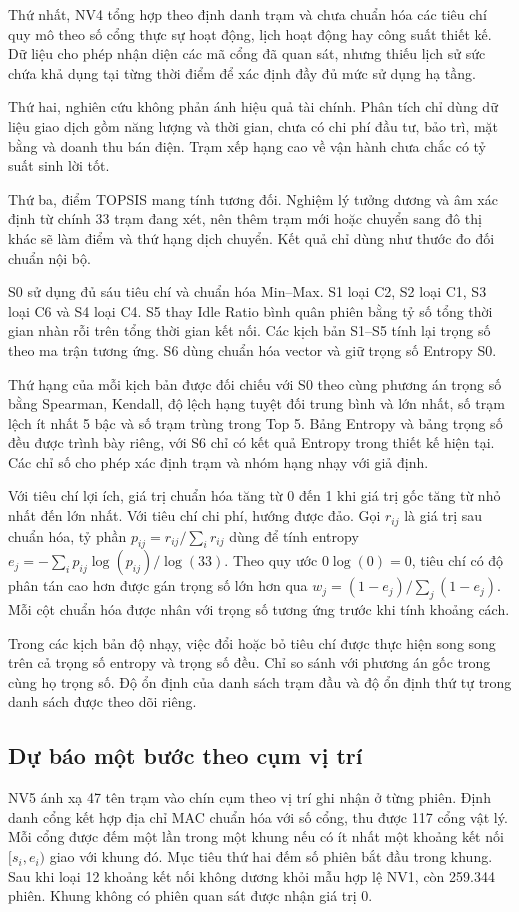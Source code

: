 \documentclass[conference,a4paper]{IEEEtran}
\begin{document}
Thứ nhất, NV4 tổng hợp theo định danh trạm và chưa chuẩn hóa các tiêu chí quy mô theo số cổng thực sự hoạt động, lịch hoạt động hay công suất thiết kế. Dữ liệu cho phép nhận diện các mã cổng đã quan sát, nhưng thiếu lịch sử sức chứa khả dụng tại từng thời điểm để xác định đầy đủ mức sử dụng hạ tầng.

Thứ hai, nghiên cứu không phản ánh hiệu quả tài chính. Phân tích chỉ dùng dữ liệu giao dịch gồm năng lượng và thời gian, chưa có chi phí đầu tư, bảo trì, mặt bằng và doanh thu bán điện. Trạm xếp hạng cao về vận hành chưa chắc có tỷ suất sinh lời tốt.

Thứ ba, điểm TOPSIS mang tính tương đối. Nghiệm lý tưởng dương và âm xác định từ chính 33 trạm đang xét, nên thêm trạm mới hoặc chuyển sang đô thị khác sẽ làm điểm và thứ hạng dịch chuyển. Kết quả chỉ dùng như thước đo đối chuẩn nội bộ.

S0 sử dụng đủ sáu tiêu chí và chuẩn hóa Min–Max. S1 loại C2, S2 loại C1, S3 loại C6 và S4 loại C4. S5 thay Idle Ratio bình quân phiên bằng tỷ số tổng thời gian nhàn rỗi trên tổng thời gian kết nối. Các kịch bản S1–S5 tính lại trọng số theo ma trận tương ứng. S6 dùng chuẩn hóa vector và giữ trọng số Entropy S0.

Thứ hạng của mỗi kịch bản được đối chiếu với S0 theo cùng phương án trọng số bằng Spearman, Kendall, độ lệch hạng tuyệt đối trung bình và lớn nhất, số trạm lệch ít nhất 5 bậc và số trạm trùng trong Top 5. Bảng Entropy và bảng trọng số đều được trình bày riêng, với S6 chỉ có kết quả Entropy trong thiết kế hiện tại. Các chỉ số cho phép xác định trạm và nhóm hạng nhạy với giả định.

Với tiêu chí lợi ích, giá trị chuẩn hóa tăng từ 0 đến 1 khi giá trị gốc tăng từ nhỏ nhất đến lớn nhất. Với tiêu chí chi phí, hướng được đảo. Gọi $r_{ij}$ là giá trị sau chuẩn hóa, tỷ phần $p_{ij}=r_{ij}/\sum_i r_{ij}$ dùng để tính entropy $e_j=-\sum_i p_{ij}\log(p_{ij})/\log(33)$. Theo quy ước $0\log(0)=0$, tiêu chí có độ phân tán cao hơn được gán trọng số lớn hơn qua $w_j=(1-e_j)/\sum_j(1-e_j)$. Mỗi cột chuẩn hóa được nhân với trọng số tương ứng trước khi tính khoảng cách.

Trong các kịch bản độ nhạy, việc đổi hoặc bỏ tiêu chí được thực hiện song song trên cả trọng số entropy và trọng số đều. Chỉ so sánh với phương án gốc trong cùng họ trọng số. Độ ổn định của danh sách trạm đầu và độ ổn định thứ tự trong danh sách được theo dõi riêng.


\subsection{Dự báo một bước theo cụm vị trí}
NV5 ánh xạ 47 tên trạm vào chín cụm theo vị trí ghi nhận ở từng phiên. Định danh cổng kết hợp địa chỉ MAC chuẩn hóa với số cổng, thu được 117 cổng vật lý. Mỗi cổng được đếm một lần trong một khung nếu có ít nhất một khoảng kết nối $[s_i,e_i)$ giao với khung đó. Mục tiêu thứ hai đếm số phiên bắt đầu trong khung. Sau khi loại 12 khoảng kết nối không dương khỏi mẫu hợp lệ NV1, còn 259.344 phiên. Khung không có phiên quan sát được nhận giá trị 0.
\end{document}
